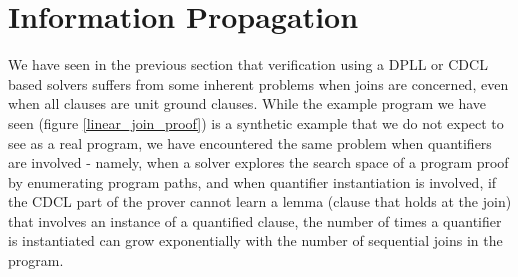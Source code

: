 \section{Information Propagation}\label{section:ugfole:propagation}
We have seen in the previous section that verification using a DPLL or CDCL based solvers suffers from some inherent problems when joins are concerned, even when all clauses are unit ground clauses. 
While the example program we have seen (figure \ref{linear_join_proof}) is a synthetic example that we do not expect to see as a real program, we have encountered the same problem when quantifiers are involved - namely, 
when a solver explores the search space of a program proof by enumerating program paths, and when quantifier instantiation is involved, 
if the CDCL part of the prover cannot learn a lemma (clause that holds at the join) that involves an instance of a quantified clause, the number of times a quantifier is instantiated can grow exponentially with the number of sequential joins in the program.

